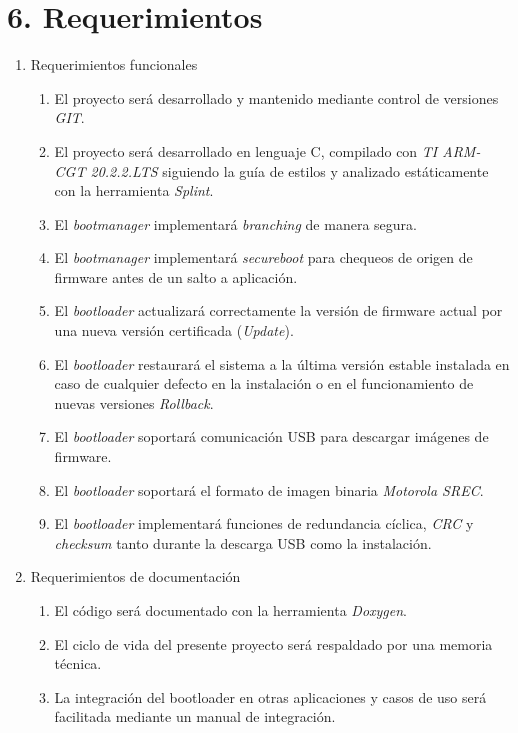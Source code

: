 \documentclass[
11pt, %
]{charter}
\begin{document}
\section{6. Requerimientos}
\label{sec:requerimientos}

\begin{enumerate}
	\item Requerimientos funcionales
		\begin{enumerate}
			\item El proyecto será desarrollado y mantenido mediante control de versiones \textit{GIT}.
			\item El proyecto será desarrollado en lenguaje C, compilado con \textit{TI ARM-CGT 20.2.2.LTS} siguiendo la guía de estilos y analizado 
			estáticamente con la herramienta \textit{Splint}.
			\item El \textit{bootmanager} implementará \textit{branching} de manera segura.
			\item El \textit{bootmanager} implementará \textit{secureboot} para chequeos de origen de firmware antes de un salto a aplicación. 
			\item El \textit{bootloader} actualizará correctamente la versión de firmware actual por una nueva versión certificada 	
			(\textit{Update}).
			\item El \textit{bootloader} restaurará el sistema a la última versión estable instalada en caso de cualquier defecto en la 
			instalación o en el funcionamiento de nuevas versiones \textit{Rollback}.
			\item El \textit{bootloader} soportará comunicación USB para descargar imágenes de firmware.
			\item El \textit{bootloader} soportará el formato de imagen binaria \textit{Motorola SREC}.
			\item El \textit{bootloader} implementará funciones de redundancia cíclica, \textit{CRC} y \textit{checksum} tanto durante la descarga 
			USB como la instalación.
		\end{enumerate}
	\item Requerimientos de documentación
		\begin{enumerate}
			\item El código será documentado con la herramienta \textit{Doxygen}.
			\item El ciclo de vida del presente proyecto será respaldado por una memoria técnica.
			\item La integración del bootloader en otras aplicaciones y casos de uso será facilitada mediante un manual de integración.

\end{enumerate}
\end{enumerate}
\end{document}
